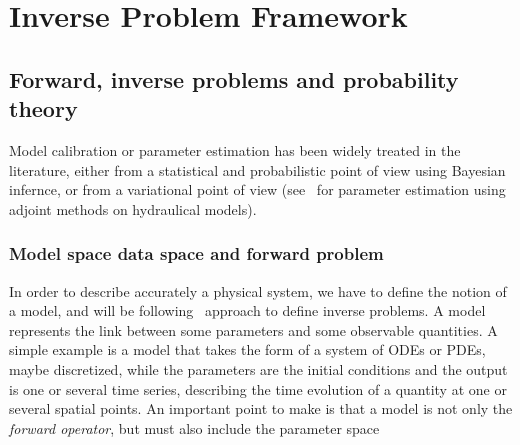 \documentclass[../../Main_ManuscritThese.tex]{subfiles}
\begin{document}
\dominitoc
\faketableofcontents
\showthe\columnwidth
\chapter{Inverse Problem Framework}
\label{chap:inverse_problem}

\minitoc
\newpage
\subfileLocal{\pagestyle{contentStyle}}


\section{Forward, inverse problems and probability theory}
Model calibration or parameter estimation has been widely treated in the literature, either from a statistical and probabilistic point of view using Bayesian infernce, or from a variational point of view (see~\cite{das_estimation_1991,das_variational_1992} for parameter estimation using adjoint methods on hydraulical models).
 \subsection{Model space data space and forward problem}
\label{sec:model_space_data_space}
In order to describe accurately a physical system, we have to define the notion of a model, and will be following~\cite{tarantola_inverse_2005} approach to define inverse problems.
 A model represents the link between some parameters and some observable quantities. A simple example is a model that takes the form of a system of ODEs or PDEs, maybe discretized, while the parameters are the initial conditions and the output is one or several time series, describing the time evolution of a quantity at one or several spatial points. An important point to make is that a model is not only the \emph{forward operator}, but must also include the parameter space
\end{document}
